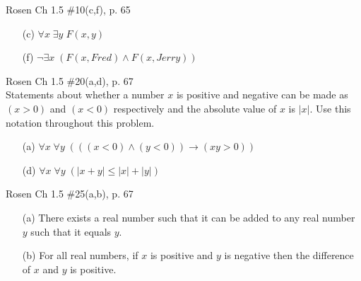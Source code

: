 \documentclass[12pt,addpoints]{exam}
\newcommand{\ra}{\rightarrow}
\begin{document}
\begin{questions}
\question Rosen Ch 1.5 \#10(c,f), p. 65
    \ifprintanswers
        \vspace{-10pt}
    \fi
\begin{solution}
    \begin{itemize}[itemsep=0pt,parsep=0pt,topsep=0pt,partopsep=0pt]
        \item[(c)] $\forall x\; \exists y\; F(x,y)$
        \item[(f)] $\neg \exists x\; (F(x, Fred) \wedge F(x,Jerry))$
    \end{itemize}
\end{solution}


\question[4] Rosen Ch 1.5 \#20(a,d), p. 67 \\
Statements about whether a number $x$ is positive and negative can be made as $(x > 0)$ and $(x < 0)$ respectively and the absolute value of $x$ is $|x|$.  Use this notation throughout this problem.
    \ifprintanswers
        \vspace{-10pt}
    \fi
\begin{solution}
    \begin{itemize}[itemsep=0pt,parsep=0pt,topsep=0pt,partopsep=0pt]
        \item[(a)] $\forall x\; \forall y\; (((x < 0) \wedge (y < 0)) \ra (xy > 0))$
        \item[(d)] $\forall x\; \forall y\; (|x + y| \leq |x| + |y|)$
    \end{itemize}
\end{solution}


\question Rosen Ch 1.5 \#25(a,b), p. 67
    \ifprintanswers
        \vspace{-10pt}
    \fi
\begin{solution}
    \begin{itemize}[itemsep=0pt,parsep=0pt,topsep=0pt,partopsep=0pt]
        \item[(a)] There exists a real number such that it can be added to any real number $y$ such that it equals $y$.
        \item[(b)] For all real numbers, if $x$ is positive and $y$ is negative then the difference of $x$ and $y$ is positive.
    \end{itemize}
\end{solution}



\end{questions}
\end{document}
